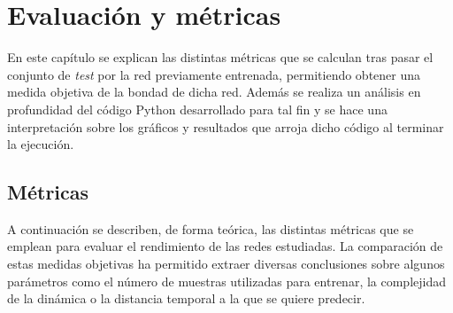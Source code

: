 \chapter{Evaluación y métricas}\label{cap.evaluacion}

En este capítulo se explican las distintas métricas que se calculan tras pasar el conjunto de \textit{test} por la red previamente entrenada, permitiendo obtener una medida objetiva de la bondad de dicha red. Además se realiza un análisis en profundidad del código Python desarrollado para tal fin y se hace una interpretación sobre los gráficos y resultados que arroja dicho código al terminar la ejecución.

\section{Métricas}

A continuación se describen, de forma teórica, las distintas métricas que se emplean para evaluar el rendimiento de las redes estudiadas. La comparación de estas medidas objetivas ha permitido extraer diversas conclusiones sobre algunos parámetros como el número de muestras utilizadas para entrenar, la complejidad de la dinámica o la distancia temporal a la que se quiere predecir.

